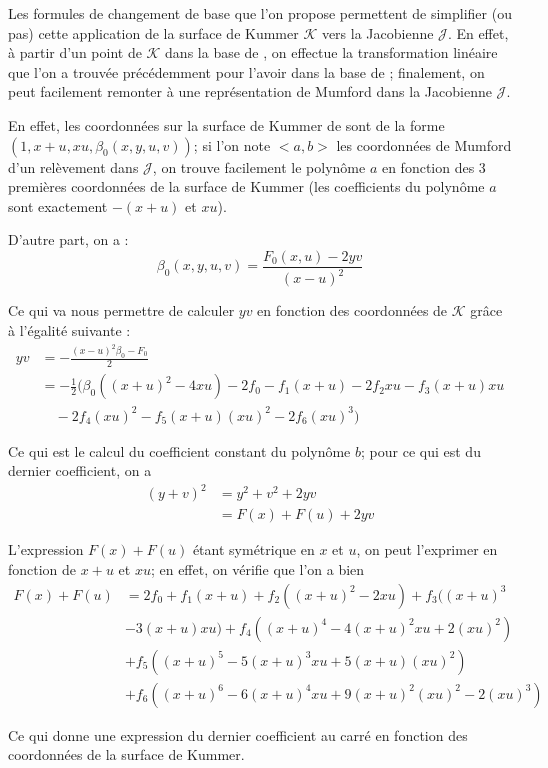 \documentclass[a4paper,12pt]{article}
\theoremstyle{definition}
\theoremstyle{remark}
\numberwithin{equation}{section}
\begin{document}
Les formules de changement de base que l'on propose permettent de simplifier (ou pas) cette application de la surface de Kummer $\mathcal{K}$ vers la Jacobienne $\mathcal{J}$. En effet, à partir d'un point de $\mathcal{K}$ dans la base de \citet{gaudry}, on effectue la transformation linéaire que l'on a trouvée précédemment pour l'avoir dans la base de \citet{cassels-Flynn}; finalement, on peut facilement remonter à une représentation de Mumford dans la Jacobienne $\mathcal{J}$.

En effet, les coordonnées sur la surface de Kummer de \citet{cassels-Flynn} sont de la forme $(1,x+u,xu,\beta_0(x,y,u,v))$; si l'on note $<a,b>$ les coordonnées de Mumford d'un relèvement dans $\mathcal{J}$, on trouve facilement le polynôme $a$ en fonction des 3 premières coordonnées de la surface de Kummer (les coefficients du polynôme $a$ sont exactement $-(x+u)$ et $xu$).

D'autre part, on a :
$$\beta_0(x,y,u,v) = \frac{F_0(x,u)-2yv}{(x-u)^2}$$

Ce qui va nous permettre de calculer $yv$ en fonction des coordonnées de $\mathcal{K}$ grâce à l'égalité suivante :
\begin{align*}
yv &= -\frac{(x-u)^2\beta_0 - F_0}{2} \\
   &= -\frac{1}{2}(\beta_0((x+u)^2-4xu) - 2f_0 - f_1(x+u) - 2f_2xu - f_3(x+u)xu \\
   & \quad - 2f_4(xu)^2 - f_5(x+u)(xu)^2 - 2f_6(xu)^3)
\end{align*}

Ce qui est le calcul du coefficient constant du polynôme $b$; pour ce qui est du dernier coefficient, on a
\begin{align*}
(y+v)^2 &= y^2 + v^2 + 2yv \\
  &= F(x) + F(u) + 2yv
\end{align*}

L'expression $F(x) + F(u)$ étant symétrique en $x$ et $u$, on peut l'exprimer en fonction de $x+u$ et $xu$; en effet, on vérifie que l'on a bien
\begin{align*}
F(x) + F(u) &= 2f_0 + f_1(x+u)+ f_2((x+u)^2 - 2xu) + f_3((x+u)^3 \\ 
   &- 3(x+u)xu) + f_4((x+u)^4 - 4(x+u)^2xu + 2(xu)^2)   \\
   &+ f_5((x+u)^5 - 5(x+u)^3xu+ 5(x+u)(xu)^2) \\
   &+ f_6((x+u)^6 - 6(x+u)^4xu + 9(x+u)^2(xu)^2 - 2 (xu)^3)
\end{align*}

Ce qui donne une expression du dernier coefficient au carré en fonction des coordonnées de la surface de Kummer.
\end{document}
